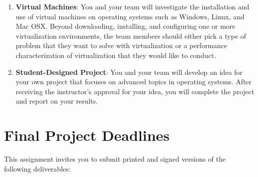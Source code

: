 \begin{enumerate}
  \item {\bf Virtual Machines}: You and your team will investigate the installation and use of virtual machines on
    operating systems such as Windows, Linux, and Mac OSX.  Beyond downloading, installing, and configuring one or more
    virtualization environments, the team members should either pick a type of problem that they want to solve with
    virtualization or a performance characterization of virtualization that they would like to conduct.  

  \item {\bf Student-Designed Project}: You and your team will develop an idea for your own project that focuses on
    advanced topics in operating systems. After receiving the instructor's approval for your idea, you will complete the
    project and report on your results.
    
\end{enumerate} 



\section*{Final Project Deadlines}

This assignment invites you to submit printed and signed versions of the following deliverables: 

